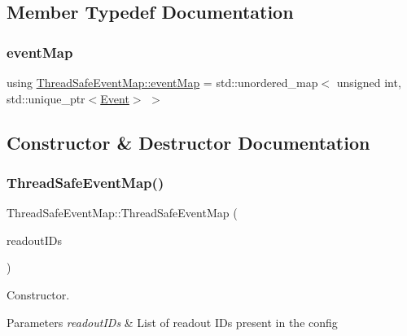 \subsection{Member Typedef Documentation}
\mbox{\label{class_thread_safe_event_map_a069c80cec7636a015d8a69574157d8d2}} 
\subsubsection{\texorpdfstring{event\+Map}{eventMap}}
{\footnotesize\ttfamily using \hyperlink{class_thread_safe_event_map_a069c80cec7636a015d8a69574157d8d2}{Thread\+Safe\+Event\+Map\+::event\+Map} =  std\+::unordered\+\_\+map$<$ unsigned int, std\+::unique\+\_\+ptr$<$\hyperlink{class_event}{Event}$>$ $>$\hspace{0.3cm}{\ttfamily [private]}}



\subsection{Constructor \& Destructor Documentation}
\mbox{\label{class_thread_safe_event_map_a766a347019971b1697e7e223290364b4}} 
\subsubsection{\texorpdfstring{Thread\+Safe\+Event\+Map()}{ThreadSafeEventMap()}\hspace{0.1cm}{\footnotesize\ttfamily [1/3]}}
{\footnotesize\ttfamily Thread\+Safe\+Event\+Map\+::\+Thread\+Safe\+Event\+Map (\begin{DoxyParamCaption}\item[{const std\+::list$<$ \hyperlink{class_readout_identifier}{Readout\+Identifier} $>$}]{readout\+I\+Ds }\end{DoxyParamCaption})}



Constructor. 


\begin{DoxyParams}{Parameters}
{\em readout\+I\+Ds} & List of readout I\+Ds present in the config \\
\hline
\end{DoxyParams}
\mbox{\label{class_thread_safe_event_map_a523d5bf6c632e3803e721ef3fd94e318}} 
